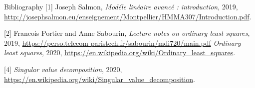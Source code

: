 \documentclass[unknownkeysallowed]{beamer}
\begin{document}
\begin{frame}{Bibliography}
[1] Joseph Salmon, \textit{Modéle linéaire avancé : introduction}, 2019, \url{http://josephsalmon.eu/enseignement/Montpellier/HMMA307/Introduction.pdf}.
\newline

[2] Francois Portier and Anne Sabourin, \textit{Lecture notes on ordinary least squares}, 2019, \url{https://perso.telecom-paristech.fr/sabourin/mdi720/main.pdf}
\newline
\newline
[3] \textit{Ordinary least squares}, 2020,
\url{https://en.wikipedia.org/wiki/Ordinary_least_squares}.
\newline

[4] \textit{Singular value decomposition}, 2020,
\url{https://en.wikipedia.org/wiki/Singular_value_decomposition}.



\end{frame}
\end{document}
